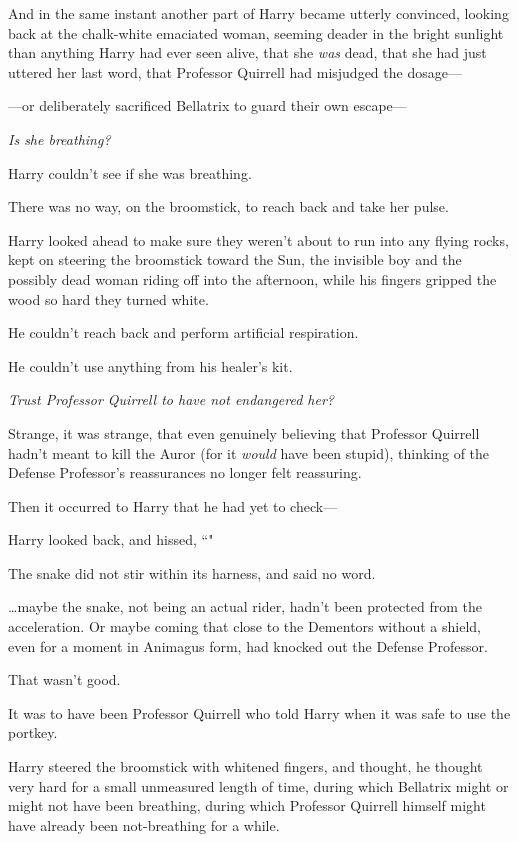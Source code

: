 And in the same instant another part of Harry became utterly convinced, looking back at the chalk-white emaciated woman, seeming deader in the bright sunlight than anything Harry had ever seen alive, that she \emph{was} dead, that she had just uttered her last word, that Professor Quirrell had misjudged the dosage—

—or deliberately sacrificed Bellatrix to guard their own escape—

\emph{Is she breathing?}

Harry couldn't see if she was breathing.

There was no way, on the broomstick, to reach back and take her pulse.

Harry looked ahead to make sure they weren't about to run into any flying rocks, kept on steering the broomstick toward the Sun, the invisible boy and the possibly dead woman riding off into the afternoon, while his fingers gripped the wood so hard they turned white.

He couldn't reach back and perform artificial respiration.

He couldn't use anything from his healer's kit.

\emph{Trust Professor Quirrell to have not endangered her?}

Strange, it was strange, that even genuinely believing that Professor Quirrell hadn't meant to kill the Auror (for it \emph{would} have been stupid), thinking of the Defense Professor's reassurances no longer felt reassuring.

Then it occurred to Harry that he had yet to check—

Harry looked back, and hissed, ``"

The snake did not stir within its harness, and said no word.

{\ldots}maybe the snake, not being an actual rider, hadn't been protected from the acceleration. Or maybe coming that close to the Dementors without a shield, even for a moment in Animagus form, had knocked out the Defense Professor.

That wasn't good.

It was to have been Professor Quirrell who told Harry when it was safe to use the portkey.

Harry steered the broomstick with whitened fingers, and thought, he thought very hard for a small unmeasured length of time, during which Bellatrix might or might not have been breathing, during which Professor Quirrell himself might have already been not-breathing for a while.

